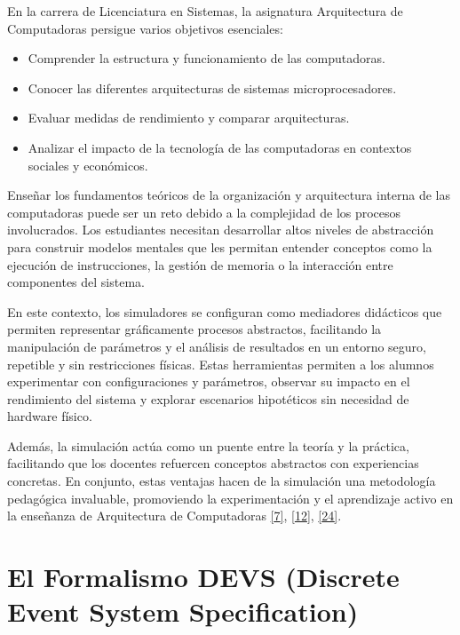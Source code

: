 \documentclass[12pt,oneside]{templates/unerthesis}
\begin{document}
En la carrera de Licenciatura en Sistemas, la asignatura Arquitectura de Computadoras persigue varios objetivos esenciales:

\begin{itemize}
\item
  Comprender la estructura y funcionamiento de las computadoras.
\item
  Conocer las diferentes arquitecturas de sistemas microprocesadores.
\item
  Evaluar medidas de rendimiento y comparar arquitecturas.
\item
  Analizar el impacto de la tecnología de las computadoras en contextos sociales y económicos.
\end{itemize}

Enseñar los fundamentos teóricos de la organización y arquitectura interna de las computadoras puede ser un reto debido a la complejidad de los procesos involucrados. Los estudiantes necesitan desarrollar altos niveles de abstracción para construir modelos mentales que les permitan entender conceptos como la ejecución de instrucciones, la gestión de memoria o la interacción entre componentes del sistema.

En este contexto, los simuladores se configuran como mediadores didácticos que permiten representar gráficamente procesos abstractos, facilitando la manipulación de parámetros y el análisis de resultados en un entorno seguro, repetible y sin restricciones físicas. Estas herramientas permiten a los alumnos experimentar con configuraciones y parámetros, observar su impacto en el rendimiento del sistema y explorar escenarios hipotéticos sin necesidad de hardware físico.

Además, la simulación actúa como un puente entre la teoría y la práctica, facilitando que los docentes refuercen conceptos abstractos con experiencias concretas. En conjunto, estas ventajas hacen de la simulación una metodología pedagógica invaluable, promoviendo la experimentación y el aprendizaje activo en la enseñanza de Arquitectura de Computadoras \protect\hyperlink{ref-garcia-garcia_pbbcache_2020}{{[}7{]}}, \protect\hyperlink{ref-nova_tool_2013}{{[}12{]}}, \protect\hyperlink{ref-skrien_cpu_2001}{{[}24{]}}.

\hypertarget{el-formalismo-devs-discrete-event-system-specification}{%
\section{El Formalismo DEVS (Discrete Event System Specification)}\label{el-formalismo-devs-discrete-event-system-specification}}
\end{document}
